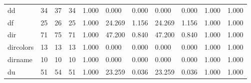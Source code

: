 \begin{longtable}{lp{1.2cm}p{1.2cm}p{1.2cm}p{1.2cm}p{1.2cm}p{1.2cm}p{1.2cm}p{1.2cm}p{1.2cm}p{1.2cm}}
dd        &                           34 &                 37 &                                34 &                                      1.000 &                                  0.000 &                                        0.000 &                             0.000 &                                   0.000 &                              1.000 &                                              1.000 \\
df        &                           25 &                 26 &                                25 &                                      1.000 &                                 24.269 &                                        1.156 &                            24.269 &                                   1.156 &                              1.000 &                                              1.000 \\
dir       &                           71 &                 75 &                                71 &                                      1.000 &                                 47.200 &                                        0.840 &                            47.200 &                                   0.840 &                              1.000 &                                              1.000 \\
dircolors &                           13 &                 13 &                                13 &                                      1.000 &                                  0.000 &                                        0.000 &                             0.000 &                                   0.000 &                              1.000 &                                              1.000 \\
dirname   &                           10 &                 10 &                                10 &                                      1.000 &                                  0.000 &                                        0.000 &                             0.000 &                                   0.000 &                              1.000 &                                              1.000 \\
du        &                           51 &                 54 &                                51 &                                      1.000 &                                 23.259 &                                        0.036 &                            23.259 &                                   0.036 &                              1.000 &                                              1.000 \\

\end{longtable}
